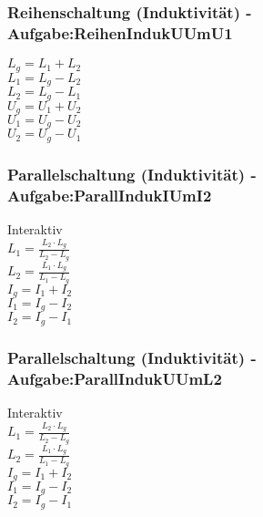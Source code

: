 \subsubsection{Reihenschaltung (Induktivität) - Aufgabe:ReihenIndukUUmU1} 
\begin{minipage}{0.45\textwidth} 
$ L_{g}  = L_{1}  + L_{2} $\\ 
$ L_{1}  = L_{g}  - L_{2} $\\ 
$ L_{2}  = L_{g}  - L_{1} $\\ 
$ U_{g}  = U_{1}  + U_{2} $\\ 
$ U_{1}  = U_{g}  - U_{2} $\\ 
$ U_{2}  = U_{g}  - U_{1} $\\ 
\end{minipage} 
\begin{minipage}{0.45\textwidth} 
 
\end{minipage} 
\subsubsection{Parallelschaltung (Induktivität) - Aufgabe:ParallIndukIUmI2} 
\begin{minipage}{0.45\textwidth} 
Interaktiv\\ 
$ L_{1}  = \frac{L_{2} \cdot L_{g} }{L_{2} -L_{g} } $\\ 
$ L_{2}  = \frac{L_{1} \cdot L_{g} }{L_{1} -L_{g} } $\\ 
$ I_{g}  = I_{1}  + I_{2} $\\ 
$ I_{1}  = I_{g}  - I_{2} $\\ 
$ I_{2}  = I_{g}  - I_{1} $\\ 
\end{minipage} 
\begin{minipage}{0.45\textwidth} 
 
\end{minipage} 
\subsubsection{Parallelschaltung (Induktivität) - Aufgabe:ParallIndukUUmL2} 
\begin{minipage}{0.45\textwidth} 
Interaktiv\\ 
$ L_{1}  = \frac{L_{2} \cdot L_{g} }{L_{2} -L_{g} } $\\ 
$ L_{2}  = \frac{L_{1} \cdot L_{g} }{L_{1} -L_{g} } $\\ 
$ I_{g}  = I_{1}  + I_{2} $\\ 
$ I_{1}  = I_{g}  - I_{2} $\\ 
$ I_{2}  = I_{g}  - I_{1} $\\ 
\end{minipage} 
\begin{minipage}{0.45\textwidth} 
 
\end{minipage} 
